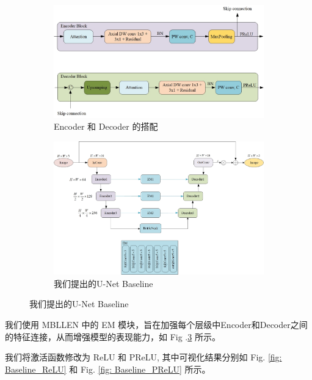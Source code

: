 \documentclass[a4paper]{ctexart}
\begin{document}
	\begin{figure}[htbp]
		\centering
		\begin{subfigure}{0.5\textwidth}
			\includegraphics[width=\linewidth]{picture/LLIE/Experiment/Encoder and Decoder}
			\captionsetup{font=scriptsize}
			\caption{Encoder 和 Decoder 的搭配}
			\label{fig: Encoder and Decoder}
		\end{subfigure}
		\begin{subfigure}{0.8\textwidth}
			\includegraphics[width=\linewidth]{picture/LLIE/Experiment/Baseline}
			\captionsetup{font=scriptsize}
			\caption{我们提出的U-Net Baseline}
			\label{fig: Baseline}
		\end{subfigure}
	\end{figure}
	
	我们使用 MBLLEN\cite{lv2018mbllen} 中的 EM 模块，旨在加强每个层级中Encoder和Decoder之间的特征连接，从而增强模型的表现能力，如 Fig .\ref{fig: Baseline} 所示。
	
	
	我们将激活函数修改为 ReLU 和 PReLU, 其中可视化结果分别如 Fig. \ref{fig: Baseline_ReLU} 和 Fig. \ref{fig: Baseline_PReLU} 所示。
	
\end{document}
